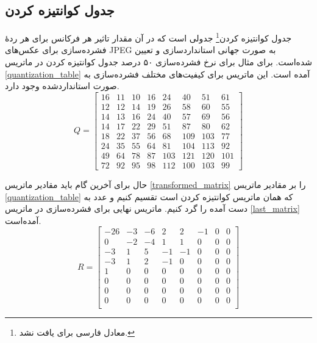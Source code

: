 \subsection{جدول کوانتیزه کردن}
جدول کوانتیزه کردن\footnote{معادل فارسی برای 
 یافت نشد.}
جدولی است که در آن مقدار تاثیر هر فرکانس برای هر ردهٔ فشرده‌سازی 
برای عکس‌های JPEG به صورت جهانی استانداردسازی و تعیین شده‌است. 
برای مثال برای نرخ فشرده‌سازی ۵۰ درصد 
جدول کوانتیزه کردن در ماتریس 
\ref{quantization_table}
آمده است. این ماتریس برای کیفیت‌های مختلف فشرده‌سازی به صورت استانداردشده وجود دارد.
\begin{equation}      
        Q = \begin{bmatrix}
                16 & 11 & 10 & 16 & 24 & 40 & 51 & 61\\
                12 & 12 & 14 & 19 & 26 & 58 & 60 & 55 \\
                14 & 13 & 16 & 24 & 40 & 57 & 69 & 56 \\
                14 & 17 & 22 & 29 & 51 & 87 & 80 & 62 \\
                18 & 22 & 37 & 56 & 68 & 109 & 103 & 77 \\
                24 & 35 & 55 & 64 & 81 & 104 & 113 & 92 \\
                49 & 64 & 78 & 87 & 103 & 121 & 120 & 101 \\
                72 & 92 & 95 & 98 & 112 & 100 & 103 & 99 

        \end{bmatrix}
        \label{quantization_table}
\end{equation}

حال برای آخرین گام باید مقادیر ماتریس
\ref{transformed_matrix}
را بر مقادیر ماتریس 
\ref{quantization_table}
که همان ماتریس کوانتیزه کردن است
تقسیم کنیم و عدد به دست آمده را گرد کنیم. ماتریس نهایی برای فشرده‌سازی در ماتریس 
\ref{last_matrix}
آمده‌است.
\begin{equation}
       R = \begin{bmatrix}
                -26 & -3 & -6 & 2 & 2 & -1 & 0 & 0\\
                0 & -2 & -4 & 1 & 1 & 0 & 0 & 0 \\
                -3 & 1 & 5 & -1 & -1 & 0 & 0 & 0 \\
                -3 & 1 & 2 & -1 & 0 & 0 & 0 & 0 \\
                1 & 0 & 0 & 0 & 0 & 0 & 0 & 0 \\
                0 & 0 & 0 & 0 & 0 & 0 & 0 & 0 \\
                0 & 0 & 0 & 0 & 0 & 0 & 0 & 0 \\
                0 & 0 & 0 & 0 & 0 & 0 & 0 & 0 \\

        \end{bmatrix}
        \label{last_matrix}
\end{equation}

